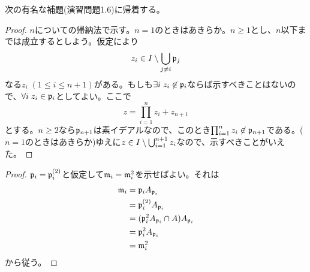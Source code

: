 \begin{rem}
  次の有名な補題(演習問題1.6)に帰着する。
  \begin{proof}
    $n$についての帰納法で示す。$n=1$のときはあきらか。$n \geq 1$とし、$n$以下までは成立するとしよう。仮定により
\[
z_i \in I \setminus \bigcup_{j \neq i} \mathfrak{p}_j
\]
なる$z_i \; (1 \leq i \leq n+1)$がある。もしも$\exists i \; z_i \not\in \mathfrak{p}_i$ならば示すべきことはないので、$\forall i \; z_i \in \mathfrak{p}_i$としてよい。ここで
\[
z = \prod_{i=1}^n z_i + z_{n+1}
\]
とする。$n \geq 2$なら$\mathfrak{p}_{n+1}$は素イデアルなので、このとき$\prod_{i=1}^n z_i \not\in \mathfrak{p}_{n+1}$である。($n =1$のときはあきらか)ゆえに$z \in I \setminus \bigcup_{i=1}^{n+1} z_{i}$なので、示すべきことがいえた。
  \end{proof}
\end{rem}



\begin{proof}
  $\mathfrak{p}_i = \mathfrak{p}_i^{(2)}$と仮定して$\mathfrak{m}_i = \mathfrak{m}_i^2$を示せばよい。それは
  \begin{align*}
    \mathfrak{m}_i &= \mathfrak{p}_i A_{\mathfrak{p}_i} \\
    &= \mathfrak{p}_i^{(2)} A_{\mathfrak{p}_i} \\
    &= (\mathfrak{p}_i^2 A_{\mathfrak{p}_i} \cap A) A_{\mathfrak{p}_i} \\
    &= \mathfrak{p}_i^2 A_{\mathfrak{p}_i} \\
    &= \mathfrak{m}_i^2
  \end{align*}
  から従う。

\end{proof}


